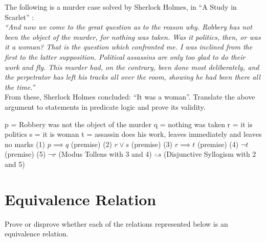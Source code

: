 \documentclass[addpoints]{exam}
\begin{document}
\begin{questions}
\question[10]
  The following is a murder case solved by Sherlock Holmes, in “A Study
  in Scarlet” :\\
  \textit{“And now we come to the great question as to the reason why. Robbery
    has not been the object of the murder, for nothing was taken. Was it
    politics, then, or was it a woman?  That is the question which confronted
    me. I was inclined from the first to the latter supposition. Political
    assassins are only too glad to do their work and fly. This murder had, on
    the contrary, been done most deliberately, and the perpetrator has left
    his tracks all over the room, showing he had been
    there all the time.”}\\
  From these, Sherlock Holmes concluded: ``It was a woman''.  Translate the
  above argument to statements in predicate logic and prove its validity.
  \begin{solution}
    p = Robbery was not the object of the murder
    \newline q = nothing was taken
    \newline r = it is politics
    \newline s = it is woman
    \newline t = assassin does his work, leaves immediately and leaves no marks
    (1) $p \implies q$ (premise) 
    \newline (2) $r \lor s$ (premise)
    \newline (3) $r \implies t$ (premise)
    \newline (4) $ \neg t$ (premise)
    \newline (5) $\neg r$ (Modus Tollens with 3 and 4)
    \newline $\therefore s$ (Disjunctive Syllogism with 2 and 5)
  \end{solution}
  
  \section{Equivalence Relation}
  
\question Prove or disprove whether each of the relations represented below is an equivalence relation.
\end{questions}
\end{document}
